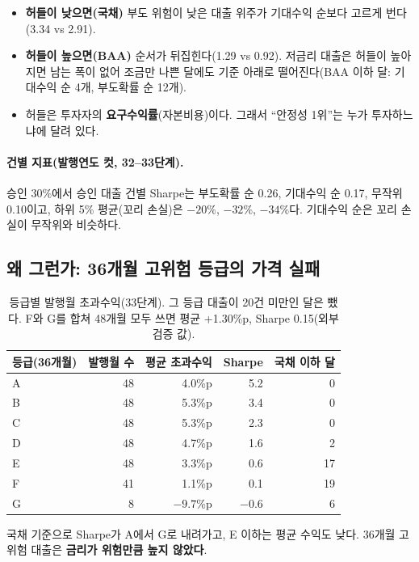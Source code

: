\begin{keybox}[읽는 법]
\begin{itemize}[leftmargin=*]
\item \textbf{허들이 낮으면(국채)} 부도 위험이 낮은 대출 위주가 기대수익 순보다 고르게 번다(3.34 vs 2.91).
\item \textbf{허들이 높으면(BAA)} 순서가 뒤집힌다(1.29 vs 0.92). 저금리 대출은 허들이 높아지면 남는 폭이 없어 조금만 나쁜 달에도 기준 아래로 떨어진다(BAA 이하 달: 기대수익 순 4개, 부도확률 순 12개).
\item 허들은 투자자의 \textbf{요구수익률}(자본비용)이다. 그래서 ``안정성 1위''는 누가 투자하느냐에 달려 있다.
\end{itemize}
\end{keybox}

\paragraph{건별 지표(발행연도 컷, 32--33단계).} 승인 30\%에서 승인 대출 건별 Sharpe는 부도확률 순 0.26, 기대수익 순 0.17, 무작위 0.10이고, 하위 5\% 평균(꼬리 손실)은 $-20\%$, $-32\%$, $-34\%$다. 기대수익 순은 꼬리 손실이 무작위와 비슷하다.

\subsection*{왜 그런가: 36개월 고위험 등급의 가격 실패}
\begin{table}[H]\centering\small
\begin{tabular}{@{}lrrrr@{}}\toprule
등급(36개월) & 발행월 수 & 평균 초과수익 & Sharpe & 국채 이하 달\\\midrule
A & 48 & 4.0\%p & 5.2 & 0\\
B & 48 & 5.3\%p & 3.4 & 0\\
C & 48 & 5.3\%p & 2.3 & 0\\
D & 48 & 4.7\%p & 1.6 & 2\\
E & 48 & 3.3\%p & 0.6 & 17\\
F & 41 & 1.1\%p & 0.1 & 19\\
G & 8 & $-9.7$\%p & $-0.6$ & 6\\\bottomrule
\end{tabular}
\caption{등급별 발행월 초과수익(33단계). 그 등급 대출이 20건 미만인 달은 뺐다. F와 G를 합쳐 48개월 모두 쓰면 평균 +1.30\%p, Sharpe 0.15(외부 검증 값).}
\end{table}
국채 기준으로 Sharpe가 A에서 G로 내려가고, E 이하는 평균 수익도 낮다. 36개월 고위험 대출은 \textbf{금리가 위험만큼 높지 않았다}.

